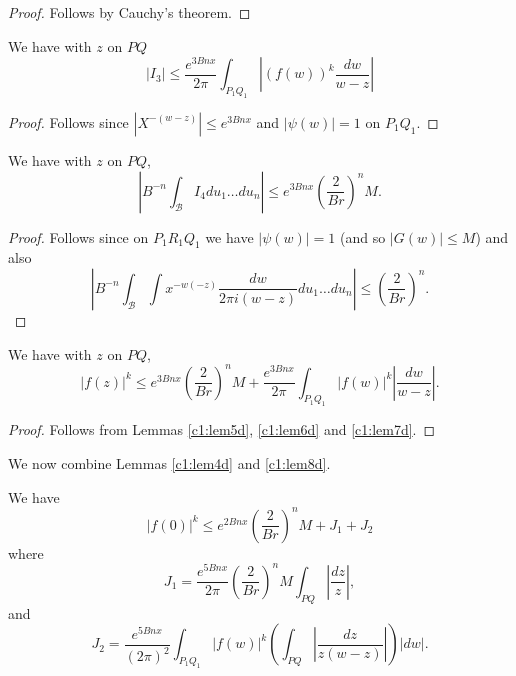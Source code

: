 \begin{proof}
Follows by Cauchy's theorem.
\end{proof}

\begin{lem}\label{c1:lem6d}
We have with $z$ on $PQ$
\begin{equation*}
|I_3| \leq \frac{e^{3Bnx}}{2\pi} \int_{P_1 Q_1} \left| (f(w))^k \frac{dw}{w-z}\right| \tag{1.7.18}\label{c1:eq1.7.18}
\end{equation*}
\end{lem}

\begin{proof}
Follows since $|X^{-(w-z)}| \leq e^{3 B nx} $ and $| \psi (w)| =1$ on $P_1 Q_1$. 
\end{proof}

\begin{lem}\label{c1:lem7d}
We have with $z$ on $PQ$,
\begin{equation*}
|B^{-n} \int_\mathcal{B} I_4 du_1 \ldots du_n | \leq e^{3 B nx} \left(\frac{2}{Br} \right)^nM.  \tag{1.7.19}\label{c1:eq1.7.19}
\end{equation*}
\end{lem}

\begin{proof}
Follows since on $P_1 R_1 Q_1$ we have $|\psi (w)| =1$ (and so $|G(w)|\leq M$) and also
$$
|B^{-n} \int_\mathcal{B} \int x^{-w(-z)} \frac{dw}{2 \pi i (w -z)} du_1 \ldots du_n| \leq \left(\frac{2}{Br} \right)^n.
$$
\end{proof}

\begin{lem}\label{c1:lem8d}
We have with $z$ on $PQ$,
\begin{equation*}
|f(z)|^k \leq e^{3Bnx} \left(\frac{2}{Br} \right)^n M + \frac{e^{3Bnx}}{2\pi} \int_{P_1 Q_1} |f(w)|^k |\frac{dw}{w-z}|.  \tag{1.7.20}\label{c1:eq1.7.20}
\end{equation*}
\end{lem}

\begin{proof}
Follows from Lemmas \ref{c1:lem5d}, \ref{c1:lem6d} and \ref{c1:lem7d}.
\end{proof}

\begin{step}\label{c1:step3}
We now combine Lemmas \ref{c1:lem4d} and \ref{c1:lem8d}.
\end{step}

\begin{lem}\label{c1:lem9d}
We have
\begin{equation*}
|f(0)|^k \leq e^{2 B nx} \left(\frac{2}{Br} \right)^n M + J_1 + J_2  \tag{1.7.21}\label{c1:eq1.7.21}
\end{equation*}
where
\begin{equation*}
J_1 = \frac{e^{5Bnx}}{2\pi}  \left(\frac{2}{Br} \right)^n M \int_{PQ}  |\frac{dz}{z}|, \tag{1.7.22}\label{c1:eq1.7.22}
\end{equation*}
and\pageoriginale
\begin{equation*}
J_2 = \frac{e^{5Bnx}}{(2\pi)^2} \int_{P_1Q_1} |f(w)|^k \left( \int_{PQ} |\frac{dz}{z(w-z)}|\right) |dw| . \tag{1.7.23}\label{c1:eq1.7.23}
\end{equation*}
\end{lem}

